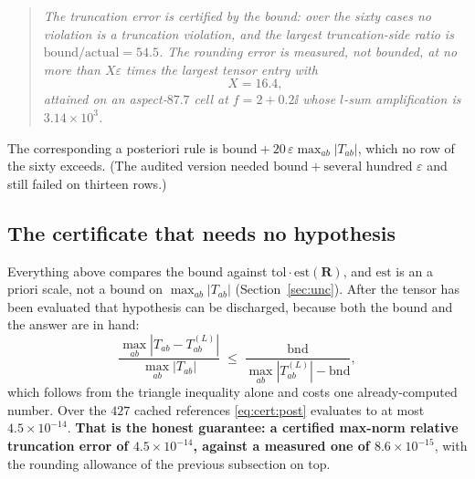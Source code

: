 \begin{quote}
\emph{The truncation error is certified by the bound: over the sixty cases no violation is
a truncation violation, and the largest truncation-side ratio is
$\mathrm{bound}/\mathrm{actual} = 54.5$. The rounding error is measured, not bounded, at no
more than $X\varepsilon$ times the largest tensor entry with
\[
X = 16.4 ,
\]
attained on an aspect-$87.7$ cell at $f = 2+0.2\ii$ whose $l$-sum amplification is
$3.14\times10^{3}$.}
\end{quote}

\noindent
The corresponding a posteriori rule is $\mathrm{bound} + 20\,\varepsilon\max_{ab}|T_{ab}|$,
which no row of the sixty exceeds. (The audited version needed
$\mathrm{bound}+\text{several hundred }\varepsilon$ and still failed on thirteen rows.)

\subsection{The certificate that needs no hypothesis}
\label{sec:bnd:cert:post}

Everything above compares the bound against $\mathrm{tol}\cdot\mathrm{est}(\mathbf{R})$, and
$\mathrm{est}$ is an a priori scale, not a bound on $\max_{ab}|T_{ab}|$
(Section~\ref{sec:unc}). After the tensor has been evaluated that hypothesis can be
discharged, because both the bound and the answer are in hand:
\begin{equation}
\frac{\max_{ab}|T_{ab}-T^{(L)}_{ab}|}{\max_{ab}|T_{ab}|}
\;\le\; \frac{\mathrm{bnd}}{\max_{ab}|T^{(L)}_{ab}| - \mathrm{bnd}} ,
\label{eq:cert:post}
\end{equation}
which follows from the triangle inequality alone and costs one already-computed number.
Over the $427$ cached references \eqref{eq:cert:post} evaluates to at most
$4.5\times10^{-14}$. \textbf{That is the honest guarantee: a certified max-norm relative
truncation error of $4.5\times10^{-14}$, against a measured one of
$8.6\times10^{-15}$}, with the rounding allowance of the previous subsection on top.

